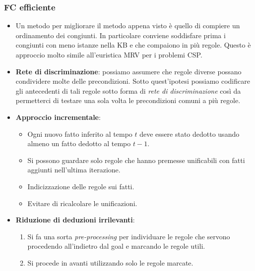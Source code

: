 \subsubsection{FC efficiente}
\begin{itemize}
	\item Un metodo per migliorare il metodo appena visto \`e quello di compiere un ordinamento dei congiunti.
	      In particolare conviene soddisfare prima i congiunti con meno istanze nella KB e che compaiono in pi\`u regole.
	      Questo \`e approccio molto simile all'euristica MRV per i problemi CSP.
	\item \textbf{Rete di discriminazione}: possiamo assumere che regole diverse possano condividere molte delle
	      precondizioni. Sotto quest'ipotesi possiamo codificare gli antecedenti di tali regole sotto forma di
	      \emph{rete di discriminazione} cos\`i da permetterci di testare una sola volta le precondizioni comuni a
	      pi\`u regole.
	\item \textbf{Approccio incrementale}:
	      \begin{itemize}
		      \item Ogni nuovo fatto inferito al tempo $t$ deve essere stato dedotto usando almeno un fatto dedotto al tempo $t-1$.
		      \item Si possono guardare solo regole che hanno premesse unificabili con fatti aggiunti nell'ultima iterazione.
		      \item Indicizzazione delle regole sui fatti.
		      \item Evitare di ricalcolare le unificazioni.
	      \end{itemize}
	\item \textbf{Riduzione di deduzioni irrilevanti}:
	      \begin{enumerate}
		      \item Si fa una sorta \emph{pre-processing} per individuare le regole che servono procedendo all'indietro
		            dal goal e marcando le regole utili.
		      \item Si procede in avanti utilizzando solo le regole marcate.
	      \end{enumerate}
\end{itemize}

